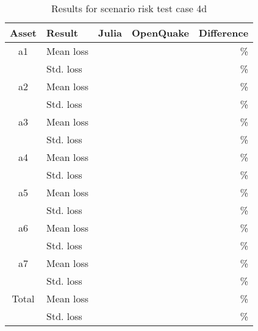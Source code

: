 \begin{table}[htbp]

\centering
\begin{tabular}{ c l r r r }

\hline
\rowcolor{anti-flashwhite}
\bf{Asset} & \bf{Result} & \bf{Julia} & \bf{OpenQuake} & \bf{Difference}\\
\hline
a1 & Mean loss &  &  & \% \\
 & Std. loss &  &  & \% \\
\hline
a2 & Mean loss &  &  & \% \\
 & Std. loss &  &  & \% \\
\hline
a3 & Mean loss &  &  & \% \\
 & Std. loss &  &  & \% \\
\hline
a4 & Mean loss &  &  & \% \\
 & Std. loss &  &  & \% \\
\hline
a5 & Mean loss &  &  & \% \\
 & Std. loss &  &  & \% \\
\hline
a6 & Mean loss &  &  & \% \\
 & Std. loss &  &  & \% \\
\hline
a7 & Mean loss &  &  & \% \\
 & Std. loss &  &  & \% \\
\hline
Total & Mean loss &  &  & \% \\
 & Std. loss &  &  & \% \\
\hline
\end{tabular}

\caption{Results for scenario risk test case 4d}
\label{tab:result-sr-4d}
\end{table}
